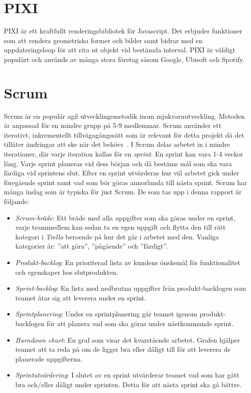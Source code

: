 \section{PIXI}
PIXI är ett kraftfullt renderingsbibliotek för Javascript. Det erbjuder funktioner som att rendera geometriska former och bilder samt bidrar med en uppdateringsloop för att rita ut objekt vid bestämda interval. PIXI är väldigt populärt och används av många stora företag såsom Google, Ubisoft och Spotify.~\cite{Pixi}

\section{Scrum}
\label{theory:scrum}
Scrum är en populär agil utvecklingsmetodik inom mjukvaruutveckling. Metoden är anpassad för en mindre grupp på 5-9 medlemmar. Scrum använder ett iterativt, inkrementellt tillvägagångssätt som är relevant för detta projekt då det tillåter ändringar att ske när det behövs~\cite{TheScrum}. I Scrum delas arbetet in i mindre iterationer, där varje iteration kallas för en \textit{sprint}. En sprint kan vara 1-4 veckor lång. Varje sprint planeras vid dess början och då bestäms mål som ska vara färdiga vid sprintens slut. Efter en sprint utvärderas hur väl arbetet gick under föregående sprint samt vad som bör göras annorlunda till nästa sprint. Scrum har många inslag som är typiska för just Scrum. De som tas upp i denna rapport är följande:

\begin{itemize}
	\item \textit{Scrum-bräde}: Ett bräde med alla uppgifter som ska göras under en sprint, varje teammedlem kan sedan ta en egen uppgift och flytta den till rätt kategori i \textit{Trello} beroende på hur det går i arbetet med den. Vanliga kategorier är: ''att göra'', ''pågående'' och ''färdigt''.

	\item \textit{Produkt-backlog}: En prioriterad lista av kundens önskemål för funktionalitet och egenskaper hos slutprodukten.

	\item \textit{Sprint-backlog}: En lista med nedbrutna uppgifter från produkt-backlogen som teamet åtar sig att leverera under en sprint.

	\item \textit{Sprintplanering}: Under en sprintplanering går teamet igenom produkt-backlogen för att planera vad som ska göras under nästkommande sprint.

	\item \textit{Burndown chart}: En graf som visar det kvarstående arbetet. Grafen hjälper teamet att ta reda på om de ligger bra eller dåligt till för att leverera de planerade uppgifterna.

	\item \textit{Sprintutvärdering}: I slutet av en sprint utvärderar teamet vad som har gått bra och/eller dåligt under sprinten. Detta för att nästa sprint ska gå bättre.

\end{itemize}

